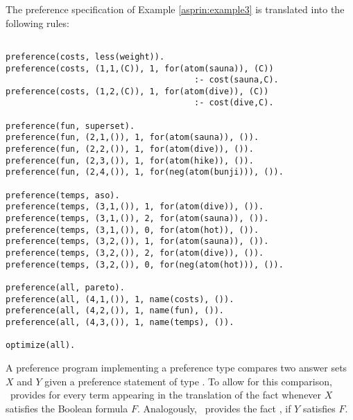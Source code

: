 \begin{example}
The preference specification of Example \ref{asprin:example3} is translated into the following rules:
\begin{lstlisting}[numbers=none,escapechar=?]

preference(costs, less(weight)).
preference(costs, (1,1,(C)), 1, for(atom(sauna)), (C))
                                      :- cost(sauna,C).
preference(costs, (1,2,(C)), 1, for(atom(dive)), (C))
                                      :- cost(dive,C).

preference(fun, superset).
preference(fun, (2,1,()), 1, for(atom(sauna)), ()).
preference(fun, (2,2,()), 1, for(atom(dive)), ()).
preference(fun, (2,3,()), 1, for(atom(hike)), ()).
preference(fun, (2,4,()), 1, for(neg(atom(bunji))), ()).

preference(temps, aso).
preference(temps, (3,1,()), 1, for(atom(dive)), ()).
preference(temps, (3,1,()), 2, for(atom(sauna)), ()).
preference(temps, (3,1,()), 0, for(atom(hot)), ()).
preference(temps, (3,2,()), 1, for(atom(sauna)), ()).
preference(temps, (3,2,()), 2, for(atom(dive)), ()).
preference(temps, (3,2,()), 0, for(neg(atom(hot))), ()).

preference(all, pareto).
preference(all, (4,1,()), 1, name(costs), ()).
preference(all, (4,2,()), 1, name(fun), ()).
preference(all, (4,3,()), 1, name(temps), ()).

optimize(all).

\end{lstlisting}
\end{example}


A preference program implementing a preference type 
compares two answer sets $X$ and $Y$
given a preference statement  of type . %
To allow for this comparison, 
\asprin\ provides
for every term  appearing in the translation of 
the fact  
whenever $X$ satisfies the Boolean formula $F$.
Analogously, \asprin\ provides the fact , if $Y$ satisfies $F$.


